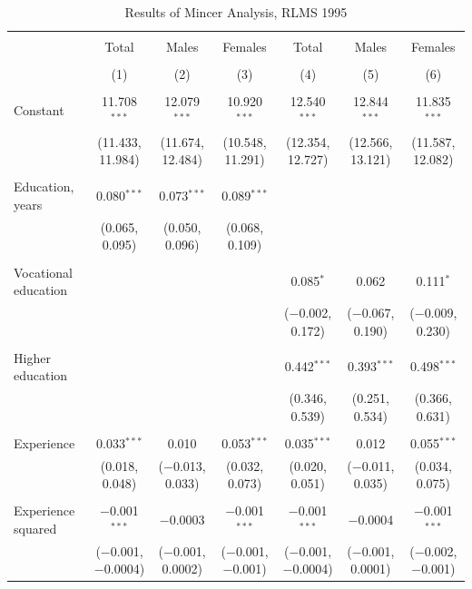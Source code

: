 \documentclass[12pt,a4paper]{article}
\numberwithin{equation}{section}
\begin{document}
\begin{landscape}
	
	\fontsize{9}{11}
	\selectfont
	
	\begin{table}[!htbp] \centering 
		\caption{Results of Mincer Analysis, RLMS 1995} 
		\label{} 
		\begin{tabular}{@{\extracolsep{5pt}}lcccccc} 
			\\[-1.8ex]\hline 
			\hline \\[-1.8ex] 
			& Total & Males & Females & Total & Males & Females \\ 
			\\[-1.8ex] & (1) & (2) & (3) & (4) & (5) & (6)\\ 
			\hline \\[-1.8ex] 
			Constant & 11.708$^{***}$ & 12.079$^{***}$ & 10.920$^{***}$ & 12.540$^{***}$ & 12.844$^{***}$ & 11.835$^{***}$ \\ 
			& (11.433, 11.984) & (11.674, 12.484) & (10.548, 11.291) & (12.354, 12.727) & (12.566, 13.121) & (11.587, 12.082) \\ 
			& & & & & & \\ 
			Education, years & 0.080$^{***}$ & 0.073$^{***}$ & 0.089$^{***}$ &  &  &  \\ 
			& (0.065, 0.095) & (0.050, 0.096) & (0.068, 0.109) &  &  &  \\ 
			& & & & & & \\ 
			Vocational education &  &  &  & 0.085$^{*}$ & 0.062 & 0.111$^{*}$ \\ 
			&  &  &  & ($-$0.002, 0.172) & ($-$0.067, 0.190) & ($-$0.009, 0.230) \\ 
			& & & & & & \\ 
			Higher education &  &  &  & 0.442$^{***}$ & 0.393$^{***}$ & 0.498$^{***}$ \\ 
			&  &  &  & (0.346, 0.539) & (0.251, 0.534) & (0.366, 0.631) \\ 
			& & & & & & \\ 
			Experience & 0.033$^{***}$ & 0.010 & 0.053$^{***}$ & 0.035$^{***}$ & 0.012 & 0.055$^{***}$ \\ 
			& (0.018, 0.048) & ($-$0.013, 0.033) & (0.032, 0.073) & (0.020, 0.051) & ($-$0.011, 0.035) & (0.034, 0.075) \\ 
			& & & & & & \\ 
			Experience squared & $-$0.001$^{***}$ & $-$0.0003 & $-$0.001$^{***}$ & $-$0.001$^{***}$ & $-$0.0004 & $-$0.001$^{***}$ \\ 
			& ($-$0.001, $-$0.0004) & ($-$0.001, 0.0002) & ($-$0.001, $-$0.001) & ($-$0.001, $-$0.0004) & ($-$0.001, 0.0001) & ($-$0.002, $-$0.001) \\ 

\end{tabular}
\end{table}
\end{landscape}
\end{document}

